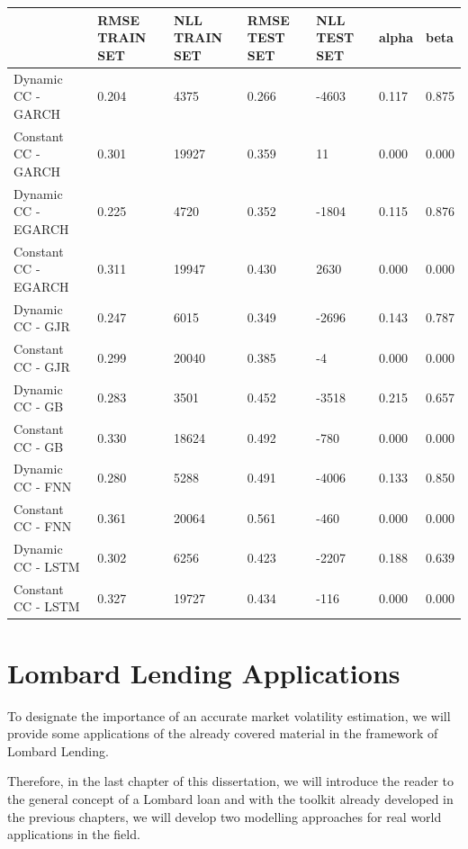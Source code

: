 \documentclass[a4paper, oneside]{discothesis}
\begin{document}
\begin{table}[!ht]\label{tbl_md_3}
    \centering
    \scriptsize
    \begin{tabular}{|p{3.5cm}||p{1.1cm}|p{1.1cm}|p{1.1cm}|p{1.1cm}||p{1.1cm}|p{1.1cm}|}
    \hline
         & RMSE TRAIN SET & NLL TRAIN SET & RMSE TEST SET & NLL TEST SET & alpha & beta \\ \hline\hline
        Dynamic CC - GARCH & 0.204 & 4375 & 0.266 & -4603 & 0.117 & 0.875 \\ \hline
        Constant CC - GARCH & 0.301 & 19927 & 0.359 & 11 & 0.000 & 0.000 \\ \hline
        Dynamic CC - EGARCH & 0.225 & 4720 & 0.352 & -1804 & 0.115 & 0.876 \\ \hline
        Constant CC - EGARCH & 0.311 & 19947 & 0.430 & 2630 & 0.000 & 0.000 \\ \hline
        Dynamic CC - GJR & 0.247 & 6015 & 0.349 & -2696 & 0.143 & 0.787 \\ \hline
        Constant CC - GJR & 0.299 & 20040 & 0.385 & -4 & 0.000 & 0.000 \\ \hline
        Dynamic CC - GB & 0.283 & 3501 & 0.452 & -3518 & 0.215 & 0.657 \\ \hline
        Constant CC - GB & 0.330 & 18624 & 0.492 & -780 & 0.000 & 0.000 \\ \hline
        Dynamic CC - FNN & 0.280 & 5288 & 0.491 & -4006 & 0.133 & 0.850 \\ \hline
        Constant CC - FNN & 0.361 & 20064 & 0.561 & -460 & 0.000 & 0.000 \\ \hline
        Dynamic CC - LSTM & 0.302 & 6256 & 0.423 & -2207 & 0.188 & 0.639 \\ \hline
        Constant CC - LSTM & 0.327 & 19727 & 0.434 & -116 & 0.000 & 0.000 \\ \hline
    \end{tabular}
\end{table}

\chapter{Lombard Lending Applications}\label{Lombard}

To designate the importance of an accurate market volatility estimation, we will provide some applications of the already covered material in the framework of Lombard Lending.

Therefore, in the last chapter of this dissertation, we will introduce the reader to the general concept of a Lombard loan and with the toolkit already developed in the previous chapters, we will develop two modelling approaches for real world applications in the field.
\end{document}

